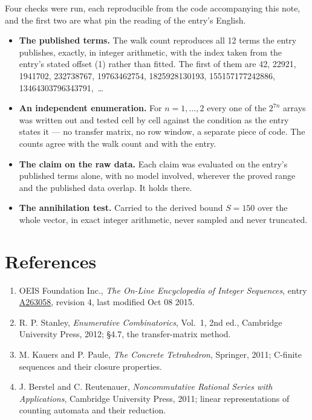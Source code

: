 \documentclass[11pt]{article}
\theoremstyle{definition}
\begin{document}
Four checks were run, each reproducible from the code accompanying this note, and the first two are what pin the reading of the entry's English.

\begin{itemize}

\item {\bfseries The published terms.} The walk count reproduces all 12 terms the entry publishes, exactly, in integer arithmetic, with the index taken from the entry's stated offset (1) rather than fitted. The first of them are 42, 22921, 1941702, 232738767, 19763462754, 1825928130193, 155157177242886, 13464303796343791,~\dots

\item {\bfseries An independent enumeration.} For $n = 1,\dots,2$ every one of the $2^{7n}$ arrays was written out and tested cell by cell against the condition as the entry states it --- no transfer matrix, no row window, a separate piece of code. The counts agree with the walk count and with the entry.

\item {\bfseries The claim on the raw data.} Each claim was evaluated on the entry's published terms alone, with no model involved, wherever the proved range and the published data overlap. It holds there.

\item {\bfseries The annihilation test.} Carried to the derived bound $S = 150$ over the whole vector, in exact integer arithmetic, never sampled and never truncated.

\end{itemize}

\section{References}

\begin{enumerate}

\item OEIS Foundation Inc., \emph{The On-Line Encyclopedia of Integer Sequences}, entry \href{https://oeis.org/A263058}{A263058}, revision 4, last modified Oct 08 2015.

\item R. P. Stanley, \emph{Enumerative Combinatorics}, Vol.~1, 2nd ed., Cambridge University Press, 2012; \S4.7, the transfer-matrix method.

\item M. Kauers and P. Paule, \emph{The Concrete Tetrahedron}, Springer, 2011; C-finite sequences and their closure properties.

\item J. Berstel and C. Reutenauer, \emph{Noncommutative Rational Series with Applications}, Cambridge University Press, 2011; linear representations of counting automata and their reduction.

\end{enumerate}
\end{document}
